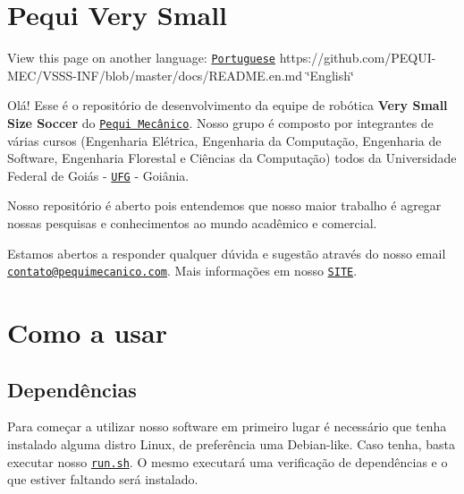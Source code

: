 

\section*{Pequi Very Small}

\href{https://travis-ci.org/PEQUI-MEC/VSSS-INF}{\tt } \href{https://www.codacy.com/app/rafaelfgjardim/VSSS-INF?utm_source=github.com&amp;utm_medium=referral&amp;utm_content=PEQUI-MEC/VSSS-INF&amp;utm_campaign=Badge_Grade}{\tt }   \href{https://github.com/PEQUI-MEC/VSSS-INF/blob/master/docs/LICENSE}{\tt }

View this page on another language\+: \href{https://github.com/PEQUI-MEC/VSSS-INF}{\tt Portuguese} https\+://github.com/\+P\+E\+Q\+U\+I-\/\+M\+E\+C/\+V\+S\+S\+S-\/\+I\+N\+F/blob/master/docs/\+R\+E\+A\+D\+M\+E.\+en.\+md \char`\"{}\+English\char`\"{}

Olá! Esse é o repositório de desenvolvimento da equipe de robótica {\bfseries Very Small Size Soccer} do \href{https://www.facebook.com/NucleoPMec/}{\tt Pequi Mecânico}. Nosso grupo é composto por integrantes de várias cursos (Engenharia Elétrica, Engenharia da Computação, Engenharia de Software, Engenharia Florestal e Ciências da Computação) todos da Universidade Federal de Goiás -\/ \href{https://www.ufg.br/}{\tt U\+FG} -\/ Goiânia.

Nosso repositório é aberto pois entendemos que nosso maior trabalho é agregar nossas pesquisas e conhecimentos ao mundo acadêmico e comercial.

Estamos abertos a responder qualquer dúvida e sugestão através do nosso email \href{mailto:contato@pequimecanico.com}{\tt contato@pequimecanico.\+com}. Mais informações em nosso \href{https://pequimecanico.com/}{\tt S\+I\+TE}.

\section*{Como a usar}

\subsection*{Dependências}

Para começar a utilizar nosso software em primeiro lugar é necessário que tenha instalado alguma distro Linux, de preferência uma Debian-\/like. Caso tenha, basta executar nosso \href{https://github.com/PEQUI-MEC/VSSS-INF/blob/master/run.sh}{\tt run.\+sh}. O mesmo executará uma verificação de dependências e o que estiver faltando será instalado.


